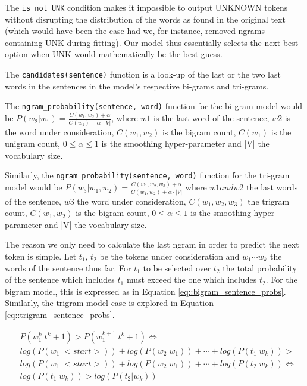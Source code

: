 \documentclass[11pt, a4paper]{article}
\begin{document}
	The \texttt{is not UNK} condition makes it impossible to output UNKNOWN tokens without disrupting the distribution of the words as found in the original text (which would have been the case had we, for instance, removed ngrams containing UNK during fitting). Our model thus essentially selects the next best option when UNK would mathematically be the best guess.
	
	The \texttt{candidates(sentence)} function is a look-up of the last or the two last words in the sentences in the model's respective bi-grams and tri-grams.
	
	The \texttt{ngram\_probability(sentence, word)} function for the bi-gram model would be $ P(w_2|w_1) = \frac{C(w_1,w_2) + \alpha}{C(w_1) + \alpha \cdot|V|} $, where  $w1$ is the last word of the sentence, $w2$ is the word under consideration, $ C(w_1,w_2) $ is the bigram count, $ C(w_1) $ is the unigram count, $ 0 \leq\alpha \leq1 $ is the smoothing hyper-parameter and |V| the vocabulary size.
	
	Similarly, the \texttt{ngram\_probability(sentence, word)} function for the tri-gram model would be $ P(w_3|w_1,w_2) = \frac{C(w_1,w_2,w_3) + \alpha}{C(w_1,w_2) + \alpha \cdot |V|} $ where  $w1 and w2$ the last words of the sentence, $w3$ the word under consideration, $ C(w_1,w_2,w_3) $ the trigram count, $ C(w_1,w_2) $ is the bigram count, $ 0 \leq\alpha \leq1 $ is the smoothing hyper-parameter and |V| the vocabulary size.
	
	The reason we only need to calculate the last ngram in order to predict the next token is simple. Let $t_1$, $t_2$ be the tokens under consideration and $w_1 \cdots w_k$ the words of the sentence thus far. For $t_1$ to be selected over $t_2$ the total probability of the sentence which includes $t_1$ must exceed the one which includes $t_2$. For the bigram model, this is expressed as in Equation \ref{eq::bigram_sentence_probs}. Similarly, the trigram model case is explored in Equation \ref{eq::trigram_sentence_probs}. 
	
	\begin{equation}
		\label{eq::bigram_sentence_probs}
		\begin{aligned}
			& P(w^{k}_1 | t^k+1) > P(w^{k+1}_1 | t^k+1) \iff \\
			& log(P(w_1|<start>)) + log(P(w_2|w_1)) + \cdots + log(P(t_1|w_k)) > \\
			& log(P(w_1|<start>)) + log(P(w_2|w_1)) + \cdots + log(P(t_2|w_k)) \iff \\
			& log(P(t_1|w_k)) > log(P(t_2|w_k))
		\end{aligned}
	\end{equation}
	
\end{document}
